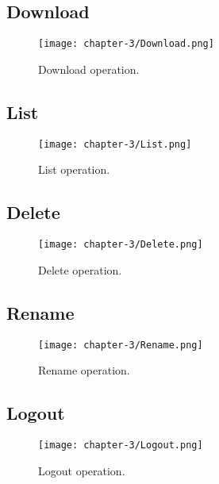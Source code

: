 \subsection{Download}

\begin{figure}[!h] 
    \centering 
    \texttt{[image: chapter-3/Download.png]} 
    \caption{Download operation.}
    \label{fig:download_operation}
\end{figure}

\subsection{List}

\begin{figure}[!h] 
    \centering 
    \texttt{[image: chapter-3/List.png]} 
    \caption{List operation.}
    \label{fig:list_operation}
\end{figure}

\subsection{Delete}

\begin{figure}[!h] 
    \centering 
    \texttt{[image: chapter-3/Delete.png]} 
    \caption{Delete operation.}
    \label{fig:delete_operation}
\end{figure}

\subsection{Rename}

\begin{figure}[!h] 
    \centering 
    \texttt{[image: chapter-3/Rename.png]} 
    \caption{Rename operation.}
    \label{fig:rename_operation}
\end{figure}

\subsection{Logout}

\begin{figure}[!h] 
    \centering 
    \texttt{[image: chapter-3/Logout.png]} 
    \caption{Logout operation.}
    \label{fig:logout_operation}
\end{figure}

